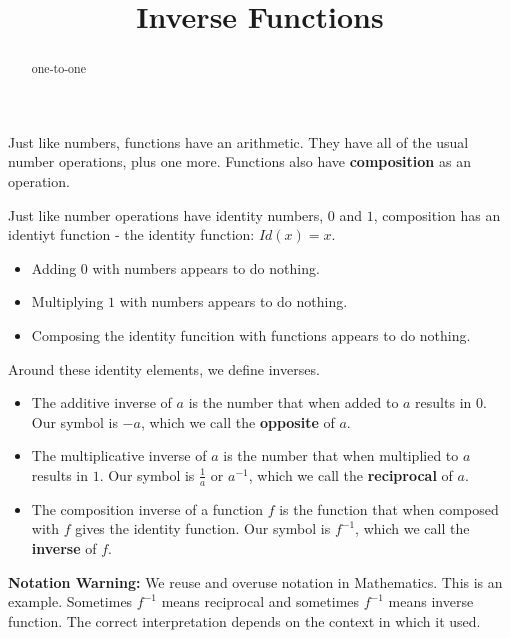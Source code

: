 \documentclass{ximera}
\title{Inverse Functions}
\begin{document}
\begin{abstract}
one-to-one
\end{abstract}
\maketitle





Just like numbers, functions have an arithmetic.  They have all of the usual number operations, plus one more.  Functions also have \textbf{composition} as an operation.

Just like number operations have identity numbers, $0$ and $1$, composition has an identiyt function - the identity function: $Id(x) = x$.


\begin{itemize}
\item Adding $0$ with numbers appears to do nothing.
\item Multiplying $1$ with numbers appears to do nothing.
\item Composing the identity funcition with functions appears to do nothing.
\end{itemize}


Around these identity elements, we define inverses.






\begin{itemize}
\item The additive inverse of $a$ is the number that when added to $a$ results in $0$.  Our symbol is $-a$, which we call the \textbf{opposite} of $a$.
\item The multiplicative inverse of $a$ is the number that when multiplied to $a$ results in $1$.  Our symbol is $\frac{1}{a}$ or $a^{-1}$, which we call the \textbf{reciprocal} of $a$.
\item The composition inverse of a function $f$ is the function that when composed with $f$ gives the identity function. Our symbol is $f^{-1}$, which we call the \textbf{inverse} of $f$.
\end{itemize}


\textbf{Notation Warning:} We reuse and overuse notation in Mathematics.  This is an example.  Sometimes $f^{-1}$ means reciprocal and sometimes $f^{-1}$ means inverse function.  The correct interpretation depends on the context in which it used.
\end{document}
